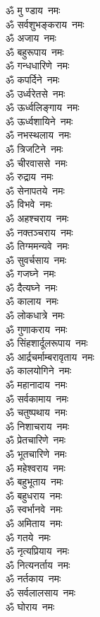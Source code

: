 \begin{multicols}{2}
\begin{flushleft}
ॐ मु ण्डाय~नमः\\
ॐ सर्वशुभङ्कराय~नमः\\
ॐ अजाय~नमः\\
ॐ बहुरूपाय~नमः\\
ॐ गन्धधारिणे~नमः\\
ॐ कपर्दिने~नमः\\
ॐ उर्ध्वरेतसे~नमः\\
ॐ ऊर्ध्वलिङ्गाय~नमः\\
ॐ ऊर्ध्वशायिने~नमः\\
ॐ नभस्थलाय~नमः\hfill{}\\
ॐ त्रिजटिने~नमः\\
ॐ चीरवाससे~नमः\\
ॐ रुद्राय~नमः\\
ॐ सेनापतये~नमः\\
ॐ विभवे~नमः\\
ॐ अहश्चराय~नमः\\
ॐ नक्तञ्चराय~नमः\\
ॐ तिग्ममन्यवे~नमः\\
ॐ सुवर्चसाय~नमः\\
ॐ गजघ्ने~नमः\hfill{}\\
ॐ दैत्यघ्ने~नमः\\
ॐ कालाय~नमः\\
ॐ लोकधात्रे~नमः\\
ॐ गुणाकराय~नमः\\
ॐ सिंहशार्दूलरूपाय~नमः\\
ॐ आर्द्रचर्माम्बरावृताय~नमः\\
ॐ कालयोगिने~नमः\\
ॐ महानादाय~नमः\\
ॐ सर्वकामाय~नमः\\
ॐ चतुष्पथाय~नमः\hfill{}\\
ॐ निशाचराय~नमः\\
ॐ प्रेतचारिणे~नमः\\
ॐ भूतचारिणे~नमः\\
ॐ महेश्वराय~नमः\\
ॐ बहुभूताय~नमः\\
ॐ बहुधराय~नमः\\
ॐ स्वर्भानवे~नमः\\
ॐ अमिताय~नमः\\
ॐ गतये~नमः\\
ॐ नृत्यप्रियाय~नमः\hfill{}\\
ॐ नित्यनर्ताय~नमः\\
ॐ नर्तकाय~नमः\\
ॐ सर्वलालसाय~नमः\\
ॐ घोराय~नमः\\

\end{flushleft}
\end{multicols}
